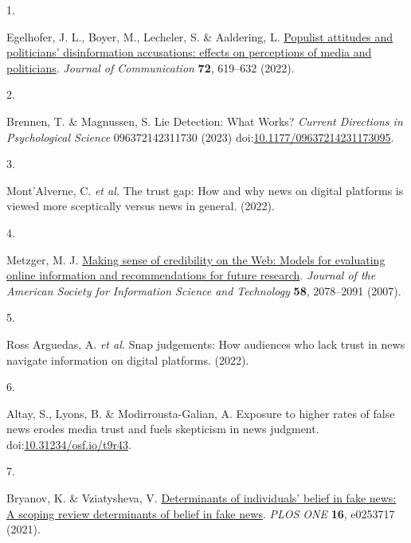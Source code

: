 \documentclass[
  man]{apa6}
\newlength{\cslhangindent}
\newlength{\csllabelwidth}
\newenvironment{CSLReferences}[2] %
 {\begin{list}{}{%
  \setlength{\itemindent}{0pt}
  \setlength{\leftmargin}{0pt}
  \setlength{\parsep}{0pt}
  \ifodd #1
   \setlength{\leftmargin}{\cslhangindent}
   \setlength{\itemindent}{-1\cslhangindent}
  \fi
  \setlength{\itemsep}{#2\baselineskip}}}
 {\end{list}}
\newcommand{\CSLLeftMargin}[1]{\parbox[t]{\csllabelwidth}{\strut#1\strut}}
\newcommand{\CSLRightInline}[1]{\parbox[t]{\linewidth - \csllabelwidth}{\strut#1\strut}}
\begin{document}
\label{refs}
\begin{CSLReferences}{0}{0}
\CSLLeftMargin{1. }%
\CSLRightInline{Egelhofer, J. L., Boyer, M., Lecheler, S. \& Aaldering, L. \href{https://doi.org/10.1093/joc/jqac031}{Populist attitudes and politicians{'} disinformation accusations: effects on perceptions of media and politicians}. \emph{Journal of Communication} \textbf{72}, 619--632 (2022).}

\CSLLeftMargin{2. }%
\CSLRightInline{Brennen, T. \& Magnussen, S. Lie Detection: What Works? \emph{Current Directions in Psychological Science} 096372142311730 (2023) doi:\href{https://doi.org/10.1177/09637214231173095}{10.1177/09637214231173095}.}

\CSLLeftMargin{3. }%
\CSLRightInline{Mont'Alverne, C. \emph{et al.} The trust gap: How and why news on digital platforms is viewed more sceptically versus news in general. (2022).}

\CSLLeftMargin{4. }%
\CSLRightInline{Metzger, M. J. \href{https://doi.org/10.1002/asi.20672}{Making sense of credibility on the Web: Models for evaluating online information and recommendations for future research}. \emph{Journal of the American Society for Information Science and Technology} \textbf{58}, 2078--2091 (2007).}

\CSLLeftMargin{5. }%
\CSLRightInline{Ross Arguedas, A. \emph{et al.} Snap judgements: How audiences who lack trust in news navigate information on digital platforms. (2022).}

\CSLLeftMargin{6. }%
\CSLRightInline{Altay, S., Lyons, B. \& Modirrousta-Galian, A. Exposure to higher rates of false news erodes media trust and fuels skepticism in news judgment. doi:\href{https://doi.org/10.31234/osf.io/t9r43}{10.31234/osf.io/t9r43}.}

\CSLLeftMargin{7. }%
\CSLRightInline{Bryanov, K. \& Vziatysheva, V. \href{https://doi.org/10.1371/journal.pone.0253717}{Determinants of individuals{'} belief in fake news: A scoping review determinants of belief in fake news}. \emph{PLOS ONE} \textbf{16}, e0253717 (2021).}


\end{CSLReferences}
\end{document}
